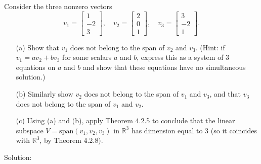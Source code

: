 Consider the three nonzero vectors
\[
v_1 =
\begin{bmatrix}
1 \\
-2 \\
3
\end{bmatrix}, \quad
v_2 =
\begin{bmatrix}
2 \\
0 \\
1
\end{bmatrix}, \quad
v_3 =
\begin{bmatrix}
3 \\
-2 \\
1
\end{bmatrix}.
\]

\begin{enumerate}
    \item[(a)] Show that $v_1$ does not belong to the span of $v_2$ and $v_3$. (Hint: if $v_1 = a v_2 + b v_3$ for some scalars $a$ and $b$, express this as a system of 3 equations on $a$ and $b$ and show that these equations have no simultaneous solution.)
    \item[(b)] Similarly show $v_2$ does not belong to the span of $v_1$ and $v_3$, and that $v_3$ does not belong to the span of $v_1$ and $v_2$.
    \item[(c)] Using (a) and (b), apply Theorem 4.2.5 to conclude that the linear subspace $V = \text{span}(v_1, v_2, v_3)$ in $\mathbb{R}^3$ has dimension equal to 3 (so it coincides with $\mathbb{R}^3$, by Theorem 4.2.8).
\end{enumerate}

Solution:


